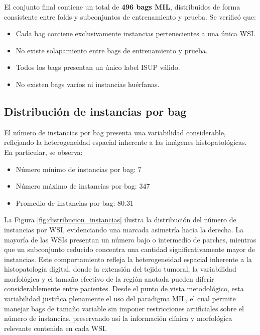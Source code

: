 El conjunto final contiene un total de \textbf{496 bags MIL}, distribuidos de forma consistente entre folds y subconjuntos de entrenamiento y prueba. Se verificó que:

\begin{itemize}
    \item Cada bag contiene exclusivamente instancias pertenecientes a una única WSI.
    \item No existe solapamiento entre bags de entrenamiento y prueba.
    \item Todos los bags presentan un único label ISUP válido.
    \item No existen bags vacíos ni instancias huérfanas.
\end{itemize}

\subsection{Distribución de instancias por bag}
El número de instancias por bag presenta una variabilidad considerable, reflejando la heterogeneidad espacial inherente a las imágenes histopatológicas. En particular, se observa:

\begin{itemize}
    \item Número mínimo de instancias por bag: 7
    \item Número máximo de instancias por bag: 347
    \item Promedio de instancias por bag: 80.31
\end{itemize}

La Figura \ref{fig:distribucion_instancias} ilustra la distribución del número de instancias por WSI, evidenciando una marcada asimetría hacia la derecha. La mayoría de las WSIs presentan un número bajo o intermedio de parches, mientras que un subconjunto reducido concentra una cantidad significativamente mayor de instancias. Este comportamiento refleja la heterogeneidad espacial inherente a la histopatología digital, donde la extensión del tejido tumoral, la variabilidad morfológica y el tamaño efectivo de la región anotada pueden diferir considerablemente entre pacientes. Desde el punto de vista metodológico, esta variabilidad justifica plenamente el uso del paradigma MIL, el cual permite manejar bags de tamaño variable sin imponer restricciones artificiales sobre el número de instancias, preservando así la información clínica y morfológica relevante contenida en cada WSI.\newline

